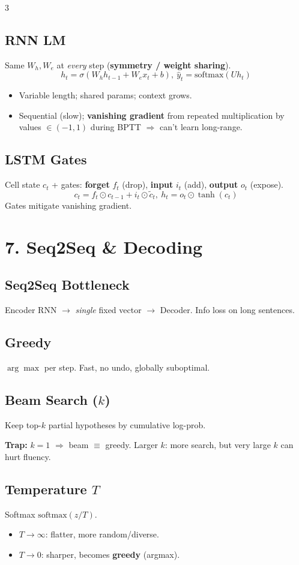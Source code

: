 \documentclass[8pt,a4paper,landscape]{extarticle}
\newcommand{\trap}[1]{{\small\colorbox{yellow!30}{\parbox{0.93\linewidth}{\textbf{\textcolor{red!70!black}{Trap:}} #1}}}}
\begin{document}
\begin{multicols*}{3}
    \subsection*{RNN LM}
    Same $W_h,W_e$ at \emph{every} step (\textbf{symmetry / weight sharing}).
    \[h_t=\sigma(W_h h_{t-1}+W_e x_t+b),\ \hat y_t=\text{softmax}(Uh_t)\]
    \begin{itemize}
        \item[+] Variable length; shared params; context grows.
        \item[--] Sequential (slow); \textbf{vanishing gradient} from repeated multiplication by values $\in(-1,1)$ during BPTT $\Rightarrow$ can't learn long-range.
    \end{itemize}

    \subsection*{LSTM Gates}
    Cell state $c_t$ + gates: \textbf{forget} $f_t$ (drop), \textbf{input} $i_t$ (add), \textbf{output} $o_t$ (expose).
    \[c_t=f_t\odot c_{t-1}+i_t\odot\tilde c_t,\ h_t=o_t\odot\tanh(c_t)\]
    Gates mitigate vanishing gradient.

    \section*{7. Seq2Seq \& Decoding}

    \subsection*{Seq2Seq Bottleneck}
    Encoder RNN $\to$ \emph{single} fixed vector $\to$ Decoder. Info loss on long sentences.

    \subsection*{Greedy}
    $\arg\max$ per step. Fast, no undo, globally suboptimal.

    \subsection*{Beam Search ($k$)}
    Keep top-$k$ partial hypotheses by cumulative log-prob.
    \trap{$k=1$ $\Rightarrow$ beam $\equiv$ greedy. Larger $k$: more search, but very large $k$ can hurt fluency.}

    \subsection*{Temperature $T$}
    Softmax $\text{softmax}(z/T)$.
    \begin{itemize}
        \item $T\to\infty$: flatter, more random/diverse.
        \item $T\to 0$: sharper, becomes \textbf{greedy} (argmax).
    \end{itemize}


\end{multicols*}
\end{document}
